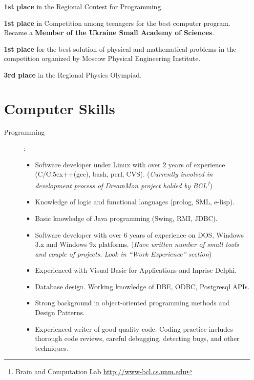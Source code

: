 \documentclass[10pt,overlapped,line]{res}
\def\Cplusplus{{\rm C\raise.5ex\hbox{\small ++}}}
\newcommand{\mplace}[1]{\textbf{#1}}
\newcommand{\wdescription}[1]{({\small \textit{#1}})}
\begin{document}
\begin{resume}
\begin{position}
\mplace{1st place} in the Regional Contest for Programming.
\end{position}

\begin{position}
  \mplace{1st place} in Competition among teenagers for the best
  computer program. Became a \mplace{Member of the Ukraine Small Academy
    of Sciences}.
\end{position}

\begin{position}
  \mplace{1st place} for the best solution of physical and mathematical
  problems in the competition organized by Moscow Physical Engineering Institute.
\end{position}

\begin{position}
  \mplace{3rd place} in the Regional Physics Olympiad.

\end{position}

\section{Computer Skills}
 \begin{description}
   \item[Programming]:\\
     \begin{itemize}

     \item Software developer under Linux with over 2 years of
       experience (C/\Cplusplus(gcc), bash, perl, CVS). 
       \wdescription{Currently involved in development process of
       DreamMon project holded by BCL\footnote{ Brain and Computation
       Lab \href{URL}{http://www-bcl.cs.unm.edu}}}

     \item Knowledge of logic and functional languages (prolog, SML, e-lisp).
     \item Basic knowledge of Java programming (Swing, RMI, JDBC).
     \item Software developer with over 6 years of experience on DOS,
       Windows 3.x and Windows 9x platforms.
       \wdescription{Have written number of small tools and couple of
       projects. Look in ``Work Experience'' section}
     \item Experienced with Visual Basic for Applications and Inprise
       Delphi.
     \item Database design. Working knowledge of DBE, ODBC, Postgresql
       APIs. 
     \item Strong background in object-oriented programming methods
       and Design Patterns.
     \item Experienced writer of good quality code. Coding practice
       includes thorough code reviews, careful debugging, detecting
       bugs, and other techniques.
     \end{itemize} 


\end{description}
\end{resume}
\end{document}
